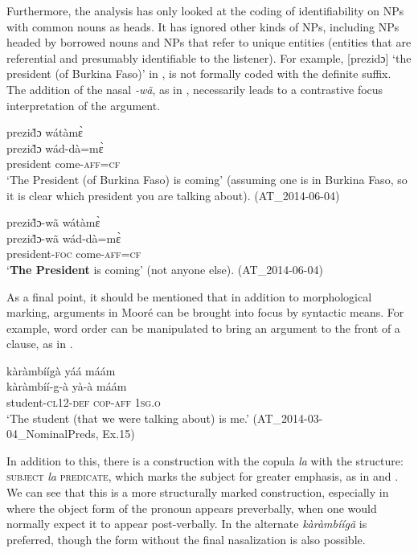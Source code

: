 \documentclass[output=paper]{langsci/langscibook}
\begin{document}
Furthermore, the analysis has only looked at the coding of identifiability on NPs with common nouns as heads. It has ignored other kinds of NPs, including NPs headed by borrowed nouns and NPs that refer to unique entities (entities that are referential and presumably identifiable to the listener). For example, [prezidɔ] ‘the president (of Burkina Faso)’ in , is not formally coded with the definite suffix. The addition of the nasal \textit{-wã}, as in , necessarily leads to a contrastive focus interpretation of the argument.

\ea\label{ex:teo:60}
\glll prezid̃ɔ wátàm\`ɛ\\
prezid̃ɔ wád-dà=m\`ɛ \\
president come\textsc{-aff=cf}\\
\glt ‘The President (of Burkina Faso) is coming’ (assuming one is in Burkina Faso, so it is clear which president you are talking about). (AT\_2014-06-04)
\z

\ea\label{ex:teo:61}
\glll prezid̃ɔ-wã wátàm\`ɛ\\
prezid̃ɔ-wã wád-dà=m\`ɛ\\
president-\textsc{foc} come\textsc{-aff=cf}\\
\glt ‘\textbf{The President} is coming’ (not anyone else). (AT\_2014-06-04)
\z

As a final point, it should be mentioned that in addition to morphological marking, arguments in Mooré can be brought into focus by syntactic means. For example, word order can be manipulated to bring an argument to the front of a clause, as in .

\ea\label{ex:teo:62}
\glll kàràmbíígà yáá máám\\
kàràmbíí-g-à yà-à máám\\
student-\textsc{cl12-def} \textsc{cop-aff} \textsc{1sg.o}\\
\glt ‘The student (that we were talking about) is me.’ (AT\_2014-03-04\_NominalPreds, Ex.15)
\z

In addition to this, there is a construction with the copula \textit{la} with the structure: \textsc{subject} \textit{la} \textsc{predicate}, which marks the subject for greater emphasis, as in  and . We can see that this is a more structurally marked construction, especially in  where the object form of the pronoun appears preverbally, when one would normally expect it to appear post-verbally. In  the alternate \textit{kàràmbíígã} is preferred, though the form without the final nasalization is also possible. 
\end{document}
